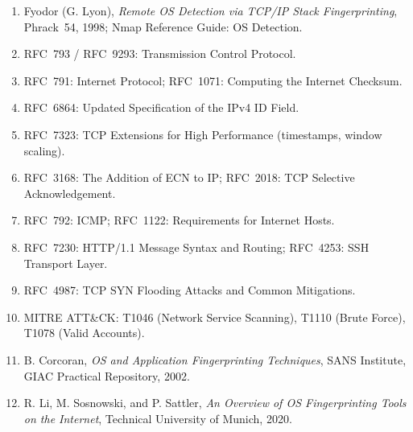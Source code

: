\begin{enumerate}[leftmargin=1.5em,itemsep=0pt,parsep=0pt,topsep=0pt,partopsep=0pt]
\item Fyodor (G. Lyon), \textit{Remote OS Detection via TCP/IP Stack Fingerprinting},
Phrack~54, 1998; Nmap Reference Guide: OS Detection.
\item RFC~793 / RFC~9293: Transmission Control Protocol.
\item RFC~791: Internet Protocol; RFC~1071: Computing the Internet Checksum.
\item RFC~6864: Updated Specification of the IPv4 ID Field.
\item RFC~7323: TCP Extensions for High Performance (timestamps, window scaling).
\item RFC~3168: The Addition of ECN to IP; RFC~2018: TCP Selective Acknowledgement.
\item RFC~792: ICMP; RFC~1122: Requirements for Internet Hosts.
\item RFC~7230: HTTP/1.1 Message Syntax and Routing; RFC~4253: SSH Transport Layer.
\item RFC~4987: TCP SYN Flooding Attacks and Common Mitigations.
\item MITRE ATT\&CK: T1046 (Network Service Scanning), T1110 (Brute Force),
T1078 (Valid Accounts).
\item B. Corcoran, \textit{OS and Application Fingerprinting Techniques}, SANS Institute, GIAC Practical Repository, 2002.
\item R. Li, M. Sosnowski, and P. Sattler, \textit{An Overview of OS Fingerprinting Tools on the Internet}, Technical University of Munich, 2020.
\end{enumerate}
